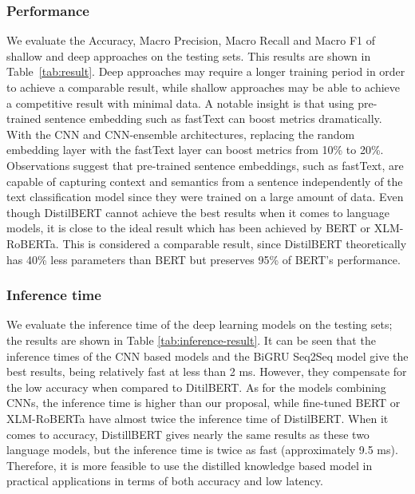 \documentclass[sn-mathphys,Numbered]{sn-jnl}%
\theoremstyle{thmstyleone}%
\theoremstyle{thmstyletwo}%
\theoremstyle{thmstylethree}%
\begin{document}
\subsubsection{Performance}
We evaluate the Accuracy, Macro Precision, Macro Recall and Macro F1 of shallow and deep approaches on the testing sets. This results are shown in Table~\ref{tab:result}. Deep approaches may require a longer training period in order to achieve a comparable result, while shallow approaches may be able to achieve a competitive result with minimal data. A notable insight is that using pre-trained sentence embedding such as fastText can boost metrics dramatically. With the CNN and CNN-ensemble architectures, replacing the random embedding layer with the fastText layer can boost metrics from 10\% to 20\%. Observations suggest that pre-trained sentence embeddings, such as fastText, are capable of capturing context and semantics from a sentence independently of the text classification model since they were trained on a large amount of data. Even though DistilBERT cannot achieve the best results when it comes to language models, it is close to the ideal result which has been achieved by BERT or XLM-RoBERTa. This is considered a comparable result, since DistilBERT theoretically has 40\% less parameters than BERT but preserves 95\% of BERT's performance.

\subsubsection{Inference time}
We evaluate the inference time of the deep learning models on the testing sets; the results are shown in Table \ref{tab:inference-result}. It can be seen that the inference times of the CNN based models and the BiGRU Seq2Seq model give the best results, being relatively fast at less than 2 ms. However, they compensate for the low accuracy when compared to DitilBERT. As for the models combining CNNs, the inference time is higher than our proposal, while fine-tuned BERT or XLM-RoBERTa have almost twice the inference time of DistilBERT. When it comes to accuracy, DistillBERT gives nearly the same results as these two language models, but the inference time is twice as fast (approximately 9.5 ms). Therefore, it is more feasible to use the distilled knowledge based model in practical applications in terms of both accuracy and low latency.
\end{document}
